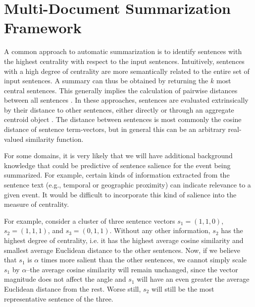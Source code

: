 \documentclass{sig-alternate} \usepackage{url} \usepackage{color}
\begin{document}
\section{Multi-Document Summarization Framework}



A common approach to automatic summarization is to identify sentences with the
highest centrality with respect to the input sentences.  Intuitively,
sentences with a high degree of centrality are more semantically related to
the entire set of input sentences.  A summary can thus be obtained by
returning the $k$ most central sentences.  This generally implies the
calculation of pairwise distances between all sentences
\cite{radev2004centroid, erkan2004lexrank}.  In these approaches, sentences
are evaluated extrinsically by their distance to other sentences, either
directly \cite{erkan2004lexrank} or through an aggregate centroid object
\cite{radev2004centroid}. The distance between sentences is most commonly the
cosine distance of sentence term-vectors, but in general this can be an
arbitrary real-valued similarity function.

For some domains, it is very likely that we will have additional background
knowledge that could be predictive of sentence salience for the event being
summarized.  For example, certain kinds of information extracted from the
sentence text (e.g., temporal or geographic proximity) can indicate relevance
to a given event.  It would be difficult to incorporate this kind of salience
into the measure of centrality.


For example, consider a cluster of three sentence vectors $s_1 = (1,1,0)$,
$s_2 = (1,1,1)$, and $s_3 = (0,1,1)$. Without any other information, $s_2$ has
the highest degree of centrality, i.e. it has the highest average cosine
similarity and smallest average Euclidean distance to the other sentences.
Now, if we believe that $s_1$ is $\alpha$ times more salient than the other
sentences, we cannot simply scale $s_1$ by $\alpha$--the average cosine
similarity will remain unchanged, since the vector magnitude does not affect
the angle and $s_1$ will have an even greater the average Euclidean distance
from the rest.  Worse still, $s_2$ will still be the most representative
sentence of the three.
\end{document}

